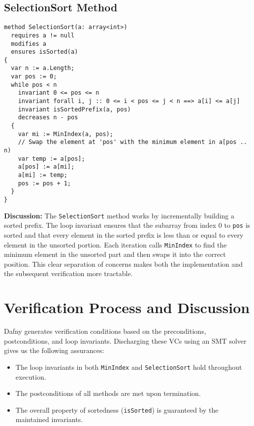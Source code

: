 \documentclass[11pt]{article}
\begin{document}
\subsection{SelectionSort Method}
\begin{lstlisting}[caption={SelectionSort Method}, label={lst:selectionsort}]
method SelectionSort(a: array<int>)
  requires a != null
  modifies a
  ensures isSorted(a)
{
  var n := a.Length;
  var pos := 0;
  while pos < n
    invariant 0 <= pos <= n
    invariant forall i, j :: 0 <= i < pos <= j < n ==> a[i] <= a[j]
    invariant isSortedPrefix(a, pos)
    decreases n - pos
  {
    var mi := MinIndex(a, pos);
    // Swap the element at 'pos' with the minimum element in a[pos .. n)
    var temp := a[pos];
    a[pos] := a[mi];
    a[mi] := temp;
    pos := pos + 1;
  }
}
\end{lstlisting}

\textbf{Discussion:}  
The \texttt{SelectionSort} method works by incrementally building a sorted prefix. The loop invariant ensures that the subarray from index 0 to \texttt{pos} is sorted and that every element in the sorted prefix is less than or equal to every element in the unsorted portion. Each iteration calls \texttt{MinIndex} to find the minimum element in the unsorted part and then swaps it into the correct position. This clear separation of concerns makes both the implementation and the subsequent verification more tractable.

\section{Verification Process and Discussion}
Dafny generates verification conditions based on the preconditions, postconditions, and loop invariants. Discharging these VCs using an SMT solver gives us the following assurances:
\begin{itemize}
    \item The loop invariants in both \texttt{MinIndex} and \texttt{SelectionSort} hold throughout execution.
    \item The postconditions of all methods are met upon termination.
    \item The overall property of sortedness (\texttt{isSorted}) is guaranteed by the maintained invariants.
\end{itemize}
\end{document}
